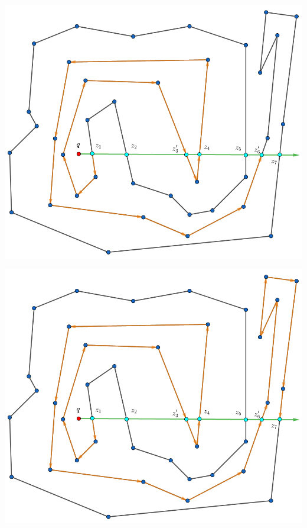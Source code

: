 \begin{frame}
  \centering \includegraphics[width=0.45 \paperwidth]{images/Poda/8.png}
\end{frame}

\begin{frame}
  \centering \includegraphics[width=0.45 \paperwidth]{images/Poda/9.png}
\end{frame}

